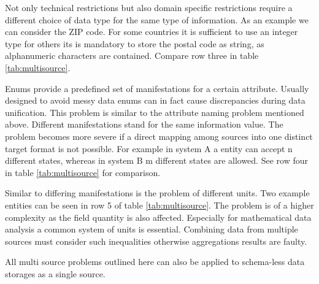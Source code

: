 Not only technical restrictions but also domain specific restrictions require a different choice of data type for the same type of information. As an example we can consider the ZIP code. For some countries it is sufficient to use an integer type for others its is mandatory to store the postal code as string, as alphanumeric characters are contained. Compare row three in table \ref{tab:multisource}. 

Enums provide a predefined set of manifestations for a certain attribute. Usually designed to avoid messy data enums can in fact cause discrepancies during data unification. This problem is similar to the attribute naming problem mentioned above. Different manifestations stand for the same information value. The problem becomes more severe if a direct mapping among sources into one distinct target format is not possible. For example in system A a entity can accept n different states, whereas in system B m different states are allowed. See row four in table \ref{tab:multisource} for comparison.

Similar to differing manifestations is the problem of different units. Two example entities can be seen in row 5 of table \ref{tab:multisource}. The problem is of a higher complexity as the field quantity is also affected. Especially for mathematical data analysis a common system of units is essential. Combining data from multiple sources must consider such inequalities otherwise aggregations results are faulty.

All multi source problems outlined here can also be applied to schema-less data storages as a single source. 

